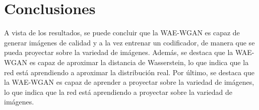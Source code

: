 \section{Conclusiones}\label{sec:conclusiones-wae-wgan}  %

A vista de los resultados, se puede concluir que la WAE-WGAN es capaz de generar imágenes de calidad y a la vez entrenar un codificador, de manera que se pueda proyectar sobre la variedad de imágenes. Además, se destaca que la WAE-WGAN es capaz de aproximar la distancia de Wasserstein, lo que indica que la red está aprendiendo a aproximar la distribución real. Por último, se destaca que la WAE-WGAN es capaz de aprender a proyectar sobre la variedad de imágenes, lo que indica que la red está aprendiendo a proyectar sobre la variedad de imágenes.

